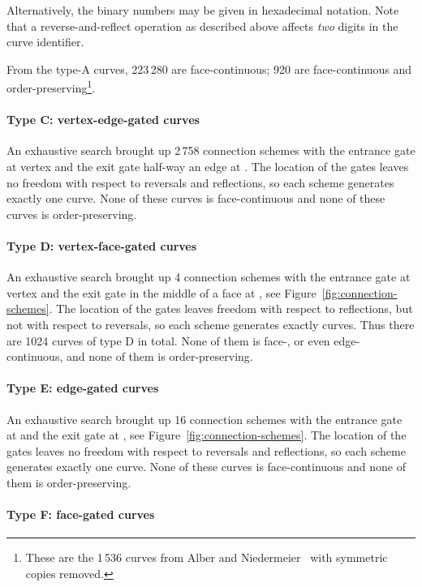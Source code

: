 \documentclass[11pt,a4paper]{article}
\begin{document}
Alternatively, the binary numbers may be given in hexadecimal notation. Note that a reverse-and-reflect operation as described above affects \emph{two} digits in the curve identifier.

From the type-A curves, 223\,280 are face-continuous; 920 are face-continuous and order-preserving\footnote{These are the 1\,536 curves from Alber and Niedermeier~\cite{Alber} with symmetric copies removed.}.

\paragraph{Type C: vertex-edge-gated curves}

An exhaustive search brought up 2\,758 connection schemes with the entrance gate at vertex  and the exit gate half-way an edge at . The location of the gates leaves no freedom with respect to reversals and reflections, so each scheme generates exactly one curve. None of these curves is face-continuous and none of these curves is order-preserving.

\paragraph{Type D: vertex-face-gated curves}

An exhaustive search brought up 4 connection schemes with the entrance gate at vertex  and the exit gate in the middle of a face at , see Figure~\ref{fig:connection-schemes}.
The location of the gates leaves freedom with respect to reflections, but not with respect to reversals, so each scheme generates exactly  curves. Thus there are 1024 curves of type D in total. None of them is face-, or even edge-continuous, and none of them is order-preserving.

\paragraph{Type E: edge-gated curves}

An exhaustive search brought up 16 connection schemes with the entrance gate at  and the exit gate at , see Figure~\ref{fig:connection-schemes}. The location of the gates leaves no freedom with respect to reversals and reflections, so each scheme generates exactly one curve. None of these curves is face-continuous and none of them is order-preserving.

\paragraph{Type F: face-gated curves}
\end{document}
